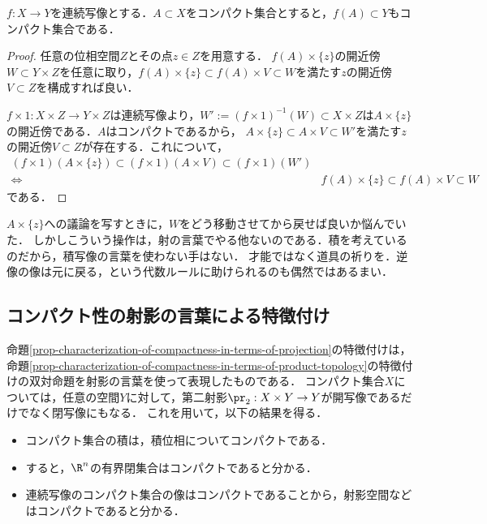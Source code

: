 \documentclass[uplatex,dvipdfmx]{jsreport}
\begin{document}
\begin{corollary}[連続写像はコンパクト性を保存する]\label{cor-image-of-compact-set-is-compact}
    $f:X\to Y$を連続写像とする．$A\subset X$をコンパクト集合とすると，$f(A)\subset Y$もコンパクト集合である．
\end{corollary}
\begin{proof}
    任意の位相空間$Z$とその点$z\in Z$を用意する．
    $f(A)\times\{z\}$の開近傍$W\subset Y\times Z$を任意に取り，$f(A)\times\{z\}\subset f(A)\times V\subset W$を満たす$z$の開近傍$V\subset Z$を構成すれば良い．

    $f\times 1:X\times Z\to Y\times Z$は連続写像より，$W':=(f\times 1)^{-1}(W)\subset X\times Z$は$A\times\{z\}$の開近傍である．$A$はコンパクトであるから，
    $A\times\{z\}\subset A\times V\subset W'$を満たす$z$の開近傍$V\subset Z$が存在する．これについて，
    \begin{align*}
        (f\times 1)(A\times\{z\})\subset(f\times 1)(A\times V)\subset(f\times 1)(W')\\
        \Leftrightarrow\quad&f(A)\times\{z\}\subset f(A)\times V\subset W
    \end{align*}
    である．
\end{proof}
\begin{remarks}
    $A\times\{z\}$への議論を写すときに，$W$をどう移動させてから戻せば良いか悩んでいた．
    しかしこういう操作は，射の言葉でやる他ないのである．積を考えているのだから，積写像の言葉を使わない手はない．
    才能ではなく道具の祈りを．逆像の像は元に戻る，という代数ルールに助けられるのも偶然ではあるまい．
\end{remarks}

\subsection{コンパクト性の射影の言葉による特徴付け}

\begin{tcolorbox}[colframe=ForestGreen, colback=ForestGreen!10!white, breakable ,colbacktitle=ForestGreen!40!white, coltitle=black,fonttitle=\bfseries\sffamily
    ,title=コンパクト性の特徴付けとその応用]
    命題\ref{prop-characterization-of-compactness-in-terms-of-projection}の特徴付けは，命題\ref{prop-characterization-of-compactness-in-terms-of-product-topology}の特徴付けの双対命題を射影の言葉を使って表現したものである．
    コンパクト集合$X$については，任意の空間$Y$に対して，第二射影$\pr_2:X\times Y\to Y$が開写像であるだけでなく閉写像にもなる．
    これを用いて，以下の結果を得る．
    \begin{itemize}
        \item コンパクト集合の積は，積位相についてコンパクトである．
        \item すると，$\R^n$の有界閉集合はコンパクトであると分かる．
        \item 連続写像のコンパクト集合の像はコンパクトであることから，射影空間などはコンパクトであると分かる．
    \end{itemize}
\end{tcolorbox}
\end{document}
